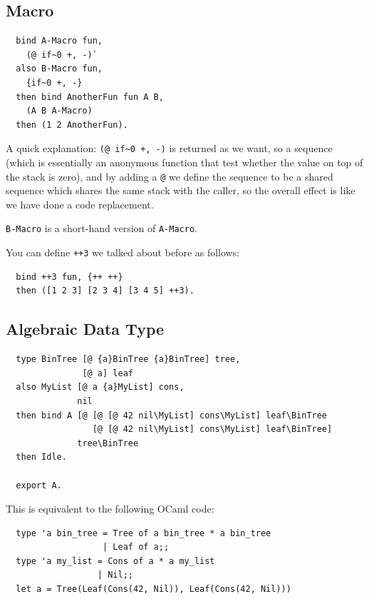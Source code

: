 \documentclass{book}
\begin{document}
\subsection{Macro}
\label{ssec:macro}
\begin{verbatim}
  bind A-Macro fun,
    (@ if~0 +, -)`
  also B-Macro fun,
    {if~0 +, -}
  then bind AnotherFun fun A B,
    (A B A-Macro)
  then (1 2 AnotherFun).
\end{verbatim}

A quick explanation: \texttt{(@ if\textasciitilde 0 +, -)} is returned as we want, so a sequence (which is essentially an anonymous function that test whether the value on top of the stack is zero), and by adding a \texttt{@} we define the sequence to be a shared sequence which shares the same stack with the caller, so the overall effect is like we have done a code replacement.

\texttt{B-Macro} is a short-hand version of \texttt{A-Macro}.

You can define \texttt{++3} we talked about before as follows:
\begin{verbatim}
  bind ++3 fun, {++ ++}
  then ([1 2 3] [2 3 4] [3 4 5] ++3).
\end{verbatim}

\subsection{Algebraic Data Type}
\label{ssec:adt-example}
\begin{verbatim}
  type BinTree [@ {a}BinTree {a}BinTree] tree,
               [@ a] leaf
  also MyList [@ a {a}MyList] cons,
              nil
  then bind A [@ [@ [@ 42 nil\MyList] cons\MyList] leaf\BinTree
                 [@ [@ 42 nil\MyList] cons\MyList] leaf\BinTree]
              tree\BinTree
  then Idle.

  export A.
\end{verbatim}

This is equivalent to the following OCaml code:
\begin{verbatim}
  type 'a bin_tree = Tree of a bin_tree * a bin_tree
                   | Leaf of a;;
  type 'a my_list = Cons of a * a my_list
                  | Nil;;
  let a = Tree(Leaf(Cons(42, Nil)), Leaf(Cons(42, Nil)))
\end{verbatim}
\end{document}
